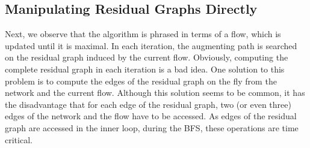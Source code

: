 \documentclass[smallcondensed]{svjour3}     %
\begin{document}
%   
% 
%   
%   
     
  \subsection{Manipulating Residual Graphs Directly}\label{sec:impl_res_graph}
  Next, we observe that the algorithm is phrased in terms of a flow, which is updated until it is maximal. 
  In each iteration, the augmenting path is searched on the residual graph induced by the current flow.
  Obviously, computing the complete residual graph in each iteration is a bad idea. 
  One solution to this problem is to compute the edges of the residual graph on the fly from the network and the current flow.
  Although this solution seems to be common, it has the disadvantage that for each edge of the residual graph, two (or even three) 
  edges of the network and the flow have to be accessed. As edges of the residual graph are accessed in the inner loop, during 
  the BFS, these operations are time critical.
  
\end{document}
